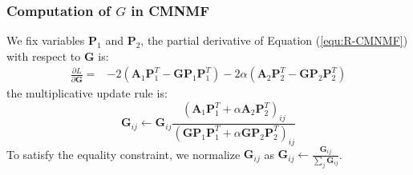 \documentclass{bmcart}
\begin{document}
\subsubsection*{\textbf{Computation of $G$ in CMNMF}}
We fix variables $\bm{P}_1$ and $\bm{P}_2$,
the partial derivative of Equation (\ref{equ:R-CMNMF}) with respect to $\bm{G}$ is:
\begin{equation}\label{equ:G_gradient}\nonumber
\begin{split}
\frac{\partial{L}}{\partial{\bm{G}}}=
&-2(\bm{A}_1{\bm{P}_1^T} - \bm{G}{\bm{P}_1}{\bm{P}_1^T})-2\alpha(\bm{A}_2{\bm{P}_2^T} - \bm{G}{\bm{P}_2}{\bm{P}_2^T})
\end{split}
\end{equation}
the multiplicative update rule is:
\begin{equation}\label{equ:updating_G}\nonumber
\bm{G}_{ij}\leftarrow \bm{G}_{ij}
\frac{(\bm{A}_1\bm{P}_1^T+\alpha \bm{A}_2\bm{P}_2^T)_{ij}}
{(\bm{GP}_1\bm{P}_1^T+\alpha \bm{GP}_2\bm{P}_2^T
)_{ij}}
\end{equation}
To satisfy the equality constraint, we normalize $\bm{G}_{ij}$ as $\bm{G}_{ij}\leftarrow\frac{\bm{G}_{ij}}{\sum_{j}\bm{G}_{ij}}$.

\end{document}
